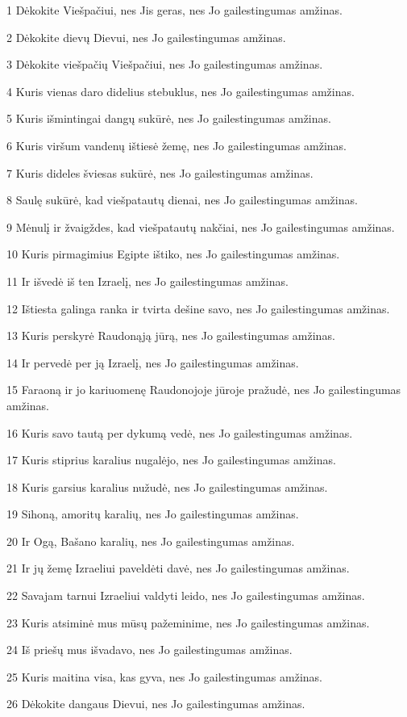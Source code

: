 \par 1 Dėkokite Viešpačiui, nes Jis geras, nes Jo gailestingumas amžinas. 
\par 2 Dėkokite dievų Dievui, nes Jo gailestingumas amžinas. 
\par 3 Dėkokite viešpačių Viešpačiui, nes Jo gailestingumas amžinas. 
\par 4 Kuris vienas daro didelius stebuklus, nes Jo gailestingumas amžinas. 
\par 5 Kuris išmintingai dangų sukūrė, nes Jo gailestingumas amžinas. 
\par 6 Kuris viršum vandenų ištiesė žemę, nes Jo gailestingumas amžinas. 
\par 7 Kuris dideles šviesas sukūrė, nes Jo gailestingumas amžinas. 
\par 8 Saulę sukūrė, kad viešpatautų dienai, nes Jo gailestingumas amžinas. 
\par 9 Mėnulį ir žvaigždes, kad viešpatautų nakčiai, nes Jo gailestingumas amžinas. 
\par 10 Kuris pirmagimius Egipte ištiko, nes Jo gailestingumas amžinas. 
\par 11 Ir išvedė iš ten Izraelį, nes Jo gailestingumas amžinas. 
\par 12 Ištiesta galinga ranka ir tvirta dešine savo, nes Jo gailestingumas amžinas. 
\par 13 Kuris perskyrė Raudonąją jūrą, nes Jo gailestingumas amžinas. 
\par 14 Ir pervedė per ją Izraelį, nes Jo gailestingumas amžinas. 
\par 15 Faraoną ir jo kariuomenę Raudonojoje jūroje pražudė, nes Jo gailestingumas amžinas. 
\par 16 Kuris savo tautą per dykumą vedė, nes Jo gailestingumas amžinas. 
\par 17 Kuris stiprius karalius nugalėjo, nes Jo gailestingumas amžinas. 
\par 18 Kuris garsius karalius nužudė, nes Jo gailestingumas amžinas. 
\par 19 Sihoną, amoritų karalių, nes Jo gailestingumas amžinas. 
\par 20 Ir Ogą, Bašano karalių, nes Jo gailestingumas amžinas. 
\par 21 Ir jų žemę Izraeliui paveldėti davė, nes Jo gailestingumas amžinas. 
\par 22 Savajam tarnui Izraeliui valdyti leido, nes Jo gailestingumas amžinas. 
\par 23 Kuris atsiminė mus mūsų pažeminime, nes Jo gailestingumas amžinas. 
\par 24 Iš priešų mus išvadavo, nes Jo gailestingumas amžinas. 
\par 25 Kuris maitina visa, kas gyva, nes Jo gailestingumas amžinas. 
\par 26 Dėkokite dangaus Dievui, nes Jo gailestingumas amžinas.


